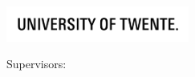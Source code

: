 \begin{titlepage}
\begin{addmargin}[-10mm]{-30mm}  %
\large
\hfill

\vfill{}


\begin{center}
\begingroup \color{Maroon} \spacedallcaps{\myTitle} \endgroup\\
\bigskip{}
\spacedlowsmallcaps{\myName}\\
\vfill{}

\par\end{center}

\begin{center}
\includegraphics[width=6cm]{gfx/UT_Logo_Black_EN}\\
 \medskip{}

\par\end{center}

\begin{center}
Supervisors:
\par\end{center}

\begin{center}
\myProf\\
\mySupervisor\\

\par\end{center}

\medskip{}


\begin{center}
\myDepartment\\
\myFaculty\\
\myUni\\
\myTime
\par\end{center}

\vfill{}


\end{addmargin} 
\end{titlepage} 
